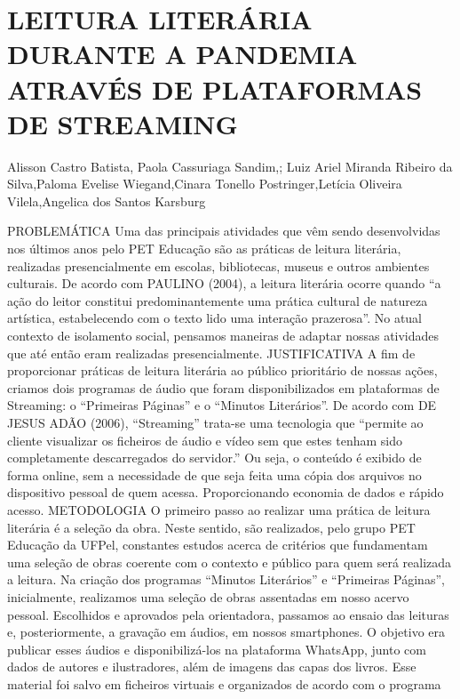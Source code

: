 

\section{LEITURA LITERÁRIA DURANTE A PANDEMIA ATRAVÉS DE PLATAFORMAS DE STREAMING}

Alisson Castro Batista, Paola Cassuriaga Sandim,; Luiz Ariel Miranda Ribeiro da  Silva,Paloma Evelise Wiegand,Cinara Tonello Postringer,Letícia Oliveira Vilela,Angelica dos Santos Karsburg

PROBLEMÁTICA
Uma das principais atividades que vêm sendo desenvolvidas nos últimos anos pelo PET 
Educação são as práticas de leitura literária, realizadas presencialmente em escolas, bibliotecas, 
museus e outros ambientes culturais. De acordo com PAULINO (2004), a leitura literária ocorre 
quando “a ação do leitor constitui predominantemente uma prática cultural de natureza artística, 
estabelecendo com o texto lido uma interação prazerosa”. No atual contexto de isolamento social, 
pensamos maneiras de adaptar nossas atividades que até então eram realizadas presencialmente.
JUSTIFICATIVA
A fim de proporcionar práticas de leitura literária ao público prioritário de nossas ações, 
criamos dois programas de áudio que foram disponibilizados em plataformas de Streaming: o 
“Primeiras Páginas” e o “Minutos Literários”. De acordo com DE JESUS ADÃO (2006), 
“Streaming” trata-se uma tecnologia que “permite ao cliente visualizar os ficheiros de áudio e 
vídeo sem que estes tenham sido completamente descarregados do servidor.” Ou seja, o conteúdo 
é exibido de forma online, sem a necessidade de que seja feita uma cópia dos arquivos no 
dispositivo pessoal de quem acessa. Proporcionando economia de dados e rápido acesso.
METODOLOGIA
O primeiro passo ao realizar uma prática de leitura literária é a seleção da obra. Neste 
sentido, são realizados, pelo grupo PET Educação da UFPel, constantes estudos acerca de critérios 
que fundamentam uma seleção de obras coerente com o contexto e público para quem será 
realizada a leitura. Na criação dos programas “Minutos Literários” e “Primeiras Páginas”, 
inicialmente, realizamos uma seleção de obras assentadas em nosso acervo pessoal. Escolhidos e 
aprovados pela orientadora, passamos ao ensaio das leituras e, posteriormente, a gravação em 
áudios, em nossos smartphones. O objetivo era publicar esses áudios e disponibilizá-los na 
plataforma WhatsApp, junto com dados de autores e ilustradores, além de imagens das capas dos 
livros. Esse material foi salvo em ficheiros virtuais e organizados de acordo com o programa 
